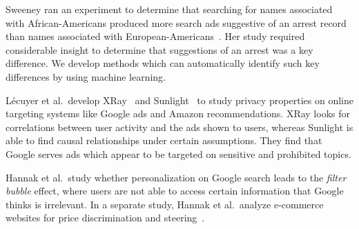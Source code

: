 \documentclass[10pt, onecolumn]{report}
\begin{document}
Sweeney ran an experiment to determine that searching for names associated 
with African-Americans produced more search ads suggestive of an arrest 
record than names associated with European-Americans~\cite{sweeney13cacm}.  
Her study required considerable insight to determine that 
suggestions of an arrest was a key difference.
We develop methods which can automatically identify such key differences by using 
machine learning. 

L\'ecuyer et al.\ develop XRay~\cite{lecuyer14usenix} and 
Sunlight~\cite{lecuyer2015sunlight} to study privacy properties on online targeting
systems like Google ads and Amazon recommendations. XRay 
looks for correlations between user activity and the ads shown to users, 
whereas Sunlight is able to find causal relationships under certain assumptions. 
They find that Google serves ads which appear to be 
targeted on sensitive and prohibited topics. 



Hannak et al.\ study whether personalization on Google 
search leads to the \emph{filter bubble} effect, where users are not able to
access certain information that Google thinks is irrelevant\cite{hannak2013measuring}.  
In a separate study, Hannak et al.\ analyze e-commerce websites for price discrimination
and steering~\cite{hannak2014measuring}. 
\end{document}
